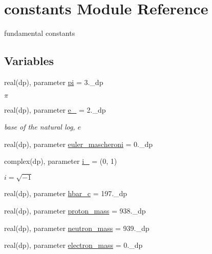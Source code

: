 \hypertarget{namespaceconstants}{}\section{constants Module Reference}
\label{namespaceconstants}


fundamental constants  


\subsection*{Variables}
\begin{DoxyCompactItemize}
\item 
real(dp), parameter \hyperlink{namespaceconstants_ae6603ac4cc80bb9d44e9b34575227d9e}{pi} = 3.\+\_\+dp
\begin{DoxyCompactList}\small\item\em $\pi$ \end{DoxyCompactList}\item 
real(dp), parameter \hyperlink{namespaceconstants_a82e235fc098d04e5dc1d79aa3b878c0a}{e\+\_\+} = 2.\+\_\+dp
\begin{DoxyCompactList}\small\item\em base of the natural log, $ e $ \end{DoxyCompactList}\item 
real(dp), parameter \hyperlink{namespaceconstants_ab36052cb8be17b195edefeaa931bcbd0}{euler\+\_\+mascheroni} = 0.\+\_\+dp
\item 
complex(dp), parameter \hyperlink{namespaceconstants_a556a79f452ecd3c709ee7314147059e4}{i\+\_\+} = (0, 1)
\begin{DoxyCompactList}\small\item\em $ i = \sqrt{-1} $ \end{DoxyCompactList}\item 
real(dp), parameter \hyperlink{namespaceconstants_a4affe715f46867c0e712960ca8264838}{hbar\+\_\+c} = 197.\+\_\+dp
\item 
real(dp), parameter \hyperlink{namespaceconstants_acaf7324e893fcf39c2ea181aff272f46}{proton\+\_\+mass} = 938.\+\_\+dp
\item 
real(dp), parameter \hyperlink{namespaceconstants_a3e7dcf06a24fcb21e535ce1d65e99ade}{neutron\+\_\+mass} = 939.\+\_\+dp
\item 
real(dp), parameter \hyperlink{namespaceconstants_ae39ccb38d503f1dd6f200f18fc41e5c0}{electron\+\_\+mass} = 0.\+\_\+dp

\end{DoxyCompactItemize}
